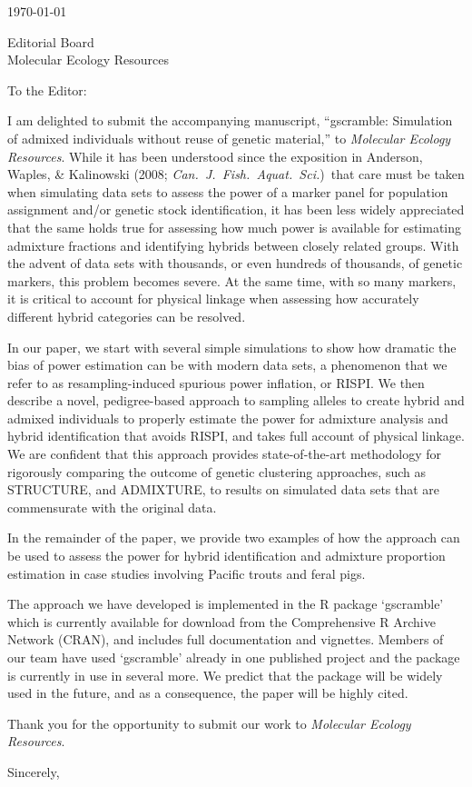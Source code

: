 \documentclass[12pt]{letter}
\date{}
\begin{document}
\begin{letter}{ \today 

Editorial Board \\
Molecular Ecology Resources
}

\pagestyle{empty}
\opening{To the Editor:}

I am delighted to submit the accompanying manuscript,
``{\sc gscramble}: Simulation of admixed individuals without reuse of genetic material,''
to {\em Molecular Ecology Resources}. While it has been understood since the exposition
in Anderson, Waples, \& Kalinowski (2008; {\em Can.\ J.\ Fish.\ Aquat.\ Sci.})\ that care must be
taken when simulating data sets to assess the power of a marker panel for population
assignment and/or genetic stock identification, it has been less widely appreciated that the
same holds true for assessing how much power is available for estimating admixture fractions
and identifying hybrids between closely related groups.  With the advent of data sets
with thousands, or even hundreds of thousands, of genetic markers, this problem
becomes severe.  At the same time, with so many markers, it is critical to account
for physical linkage when assessing how accurately different hybrid categories
can be resolved.

In our paper, we start with several simple simulations to show how dramatic the bias
of power estimation can be with modern data sets, a phenomenon that we refer to
as resampling-induced spurious power inflation, or RISPI.  We then describe a novel,
pedigree-based approach to sampling alleles to create hybrid and admixed individuals
to properly estimate the power for admixture analysis and hybrid identification that avoids
RISPI, and takes full account of physical linkage. We are confident that this approach provides
state-of-the-art methodology for rigorously comparing the outcome of
genetic clustering approaches, such as STRUCTURE, and ADMIXTURE, to results on
simulated data sets that are commensurate with the original data.

In the remainder of the paper, we provide two examples of how the approach can
be used to assess the power for hybrid identification and admixture proportion estimation
in case studies involving Pacific trouts and feral pigs.  

The approach we have developed is implemented in the R package `gscramble' which
is currently available for download from the Comprehensive R Archive
Network (CRAN), and includes full documentation and vignettes.
Members of our team have used `gscramble' already in one published project and
the package is currently in use in several more.   We predict that the package will be
widely used in the future, and as a consequence, the paper will be highly cited.  

Thank you for the opportunity to submit our work to {\em Molecular Ecology Resources}.  


\closing{Sincerely,}
\setlength{\topmargin}{0in}
\end{letter}

 
\end{document}
